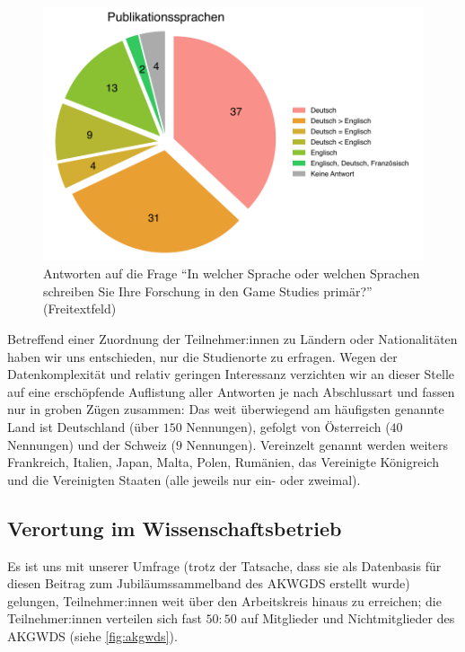 \documentclass{scrartcl}
\begin{document}
\begin{figure}[ht]
   \includegraphics[width=1\textwidth]{sprache.pdf}
   \caption{Antworten auf die Frage \enquote{In welcher Sprache oder welchen Sprachen schreiben Sie Ihre Forschung in den Game Studies primär?} (Freitextfeld)}
   \label{fig:sprache}
\end{figure}

Betreffend einer Zuordnung der Teilnehmer:innen zu Ländern oder Nationalitäten haben wir uns entschieden, nur die Studienorte zu erfragen.
Wegen der Datenkomplexität und relativ geringen Interessanz verzichten wir an dieser Stelle auf eine erschöpfende Auflistung aller Antworten je nach Abschlussart und fassen nur in groben Zügen zusammen:
Das weit überwiegend am häufigsten genannte Land ist Deutschland (über $150$ Nennungen), gefolgt von Österreich ($40$ Nennungen) und der Schweiz ($9$ Nennungen).
Vereinzelt genannt werden weiters Frankreich, Italien, Japan, Malta, Polen, Rumänien, das Vereinigte Königreich und die Vereinigten Staaten (alle jeweils nur ein- oder zweimal).


\subsection{Verortung im Wissenschaftsbetrieb}\label{sec:resultate_verortung}
Es ist uns mit unserer Umfrage (trotz der Tatsache, dass sie als Datenbasis für diesen Beitrag zum Jubiläumssammelband des AKWGDS erstellt wurde) gelungen, Teilnehmer:innen weit über den Arbeitskreis hinaus zu erreichen; die Teilnehmer:innen verteilen sich fast $50:50$ auf Mitglieder und Nichtmitglieder des AKGWDS (siehe \autoref{fig:akgwds}).
\end{document}
